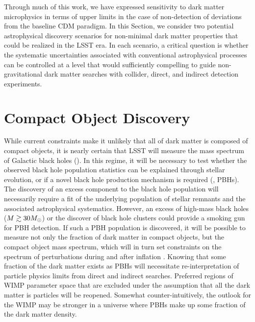 
Through much of this work, we have expressed sensitivity to dark matter microphysics in terms of upper limits in the case of non-detection of deviations from the baseline CDM paradigm.
In this Section, we consider two potential astrophysical discovery scenarios for non-minimal dark matter properties that could be realized in the LSST era.
In each scenario, a critical question is whether the systematic uncertainties associated with conventional astrophysical processes can be controlled at a level that would sufficiently compelling to guide non-gravitational dark matter searches with collider, direct, and indirect detection experiments.

\section{Compact Object Discovery}

While current constraints make it unlikely that all of dark matter is composed of compact objects, it is nearly certain that LSST will measure the mass spectrum of Galactic black holes ().
In this regime, it will be necessary to test whether the observed black hole population statistics can be explained through stellar evolution, or if a novel black hole production mechanism is required (\ie, PBHs).
The discovery of an excess component to the black hole population will necessarily require a fit of the underlying population of stellar remnants and the associated astrophysical systematics. 
However, an excess of high-mass black holes ($M \gtrsim 30M_\odot$) or the discover of black hole clusters \citep[\eg][]{1603.05234} could provide a smoking gun for PBH detection.
If such a PBH population is discovered, it will be possible to measure not only the fraction of dark matter in compact objects, but the compact object mass spectrum, which will in turn set constraints on the spectrum of perturbations during and after inflation \citep[\eg][]{:1702.03901}.
Knowing that some fraction of the dark matter exists as PBHs will necessitate re-interpretation of particle physics limits from direct and indirect searches.
Preferred regions of WIMP parameter space that are excluded under the assumption that all the dark matter is particles will be reopened.
Somewhat counter-intuitively, the outlook for the WIMP may be stronger in a universe where PBHs make up some fraction of the dark matter density.

